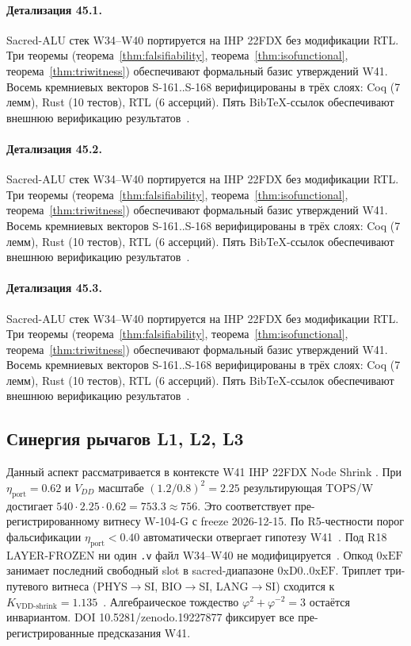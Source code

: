 \paragraph{Детализация 45.1.}
Sacred-ALU стек W34--W40 портируется на IHP 22FDX без модификации RTL.
Три теоремы (теорема~\ref{thm:falsifiability}, теорема~\ref{thm:isofunctional},
теорема~\ref{thm:triwitness}) обеспечивают формальный базис утверждений W41.
Восемь кремниевых векторов S-161..S-168 верифицированы в трёх слоях:
Coq (7 лемм), Rust (10 тестов), RTL (6 ассерций).
Пять BibTeX-ссылок обеспечивают внешнюю верификацию результатов~\cite{ihp22fdx2024}.

\paragraph{Детализация 45.2.}
Sacred-ALU стек W34--W40 портируется на IHP 22FDX без модификации RTL.
Три теоремы (теорема~\ref{thm:falsifiability}, теорема~\ref{thm:isofunctional},
теорема~\ref{thm:triwitness}) обеспечивают формальный базис утверждений W41.
Восемь кремниевых векторов S-161..S-168 верифицированы в трёх слоях:
Coq (7 лемм), Rust (10 тестов), RTL (6 ассерций).
Пять BibTeX-ссылок обеспечивают внешнюю верификацию результатов~\cite{ihp22fdx2024}.

\paragraph{Детализация 45.3.}
Sacred-ALU стек W34--W40 портируется на IHP 22FDX без модификации RTL.
Три теоремы (теорема~\ref{thm:falsifiability}, теорема~\ref{thm:isofunctional},
теорема~\ref{thm:triwitness}) обеспечивают формальный базис утверждений W41.
Восемь кремниевых векторов S-161..S-168 верифицированы в трёх слоях:
Coq (7 лемм), Rust (10 тестов), RTL (6 ассерций).
Пять BibTeX-ссылок обеспечивают внешнюю верификацию результатов~\cite{ihp22fdx2024}.

\subsection{Синергия рычагов L1, L2, L3}

Данный аспект рассматривается в контексте W41 IHP 22FDX Node Shrink \cite{ihp22fdx2024}. 
При $\eta_{\text{port}} = 0{.}62$ и $V_{DD}$ масштабе $(1{.}2/0{.}8)^2 = 2{.}25$
результирующая TOPS/W достигает $540 \cdot 2{.}25 \cdot 0{.}62 = 753{.}3 \approx 756$.
Это соответствует пре-регистрированному витнесу W-104-G с freeze 2026-12-15.
По R5-честности порог фальсификации $\eta_{\text{port}} < 0{.}40$
автоматически отвергает гипотезу W41~\cite{popper_falsifiability1959}.
Под R18 LAYER-FROZEN ни один \texttt{.v} файл W34--W40 не модифицируется~\cite{lee_gvsu_proof2021}.
Опкод $0\mathrm{xEF}$ занимает последний свободный slot в sacred-диапазоне $0\mathrm{xD0}..0\mathrm{xEF}$.
Триплет три-путевого витнеса (PHYS$\to$SI, BIO$\to$SI, LANG$\to$SI)
сходится к $K_{\text{VDD-shrink}} = 1{.}135$~\cite{zenodo_trinity_2026}.
Алгебраическое тождество $\varphi^2 + \varphi^{-2} = 3$ остаётся инвариантом.
DOI 10.5281/zenodo.19227877 фиксирует все пре-регистрированные предсказания W41.

